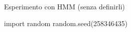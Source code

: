 \documentclass[11pt,twoside,a4paper]{article}
\newcounter{quesito}
\newenvironment{question}{\bigskip\addtocounter{quesito}{1}\bigskip\bigskip\par\textbf{Quesito \thequesito.\kern0ex}}{\par\vspace{\parskip}}
\begin{document}
\colorbox{blue!10}{\begin{minipage}{\textwidth}
Esperimento con HMM (senza definirli)

\end{minipage}}

\bigskip\bigskip


\begin{pycode}
import random
random.seed(258346435)
\end{pycode}


% 
% 
% 
% 
% 
%  
\end{document}
